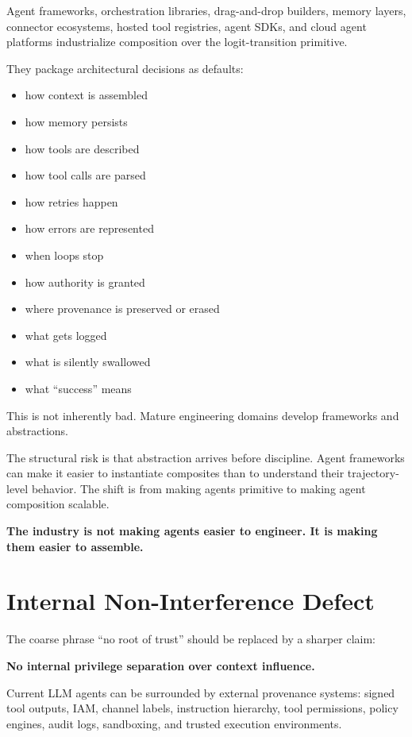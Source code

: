 \documentclass[11pt]{article}
\begin{document}
Agent frameworks, orchestration libraries, drag-and-drop builders, memory layers, connector ecosystems, hosted tool registries, agent SDKs, and cloud agent platforms industrialize composition over the logit-transition primitive.

They package architectural decisions as defaults:
\begin{itemize}
\item how context is assembled
\item how memory persists
\item how tools are described
\item how tool calls are parsed
\item how retries happen
\item how errors are represented
\item when loops stop
\item how authority is granted
\item where provenance is preserved or erased
\item what gets logged
\item what is silently swallowed
\item what ``success'' means
\end{itemize}

This is not inherently bad. Mature engineering domains develop frameworks and abstractions.

The structural risk is that abstraction arrives before discipline. Agent frameworks can make it easier to instantiate composites than to understand their trajectory-level behavior. The shift is from making agents primitive to making agent composition scalable.

\begin{pullquote}
\textbf{The industry is not making agents easier to engineer. It is making them easier to assemble.}
\end{pullquote}

\section{Internal Non-Interference Defect}

The coarse phrase ``no root of trust'' should be replaced by a sharper claim:

\begin{pullquote}
\textbf{No internal privilege separation over context influence.}
\end{pullquote}

Current LLM agents can be surrounded by external provenance systems: signed tool outputs, IAM, channel labels, instruction hierarchy, tool permissions, policy engines, audit logs, sandboxing, and trusted execution environments.
\end{document}
